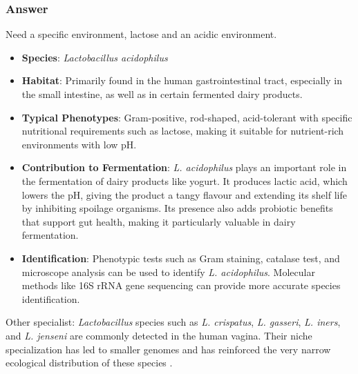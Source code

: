 \subsubsection*{Answer}
Need a specific environment, lactose and an acidic environment.
\begin{itemize}
    \item \textbf{Species}: \textit{Lactobacillus acidophilus}
    \item \textbf{Habitat}: Primarily found in the human gastrointestinal tract, especially in the small intestine, as well as in certain fermented dairy products.
    \item \textbf{Typical Phenotypes}: Gram-positive, rod-shaped, acid-tolerant with specific nutritional requirements such as lactose, making it suitable for nutrient-rich environments with low pH.
    \item \textbf{Contribution to Fermentation}: \textit{L. acidophilus} plays an important role in the fermentation of dairy products like yogurt. It produces lactic acid, which lowers the pH, giving the product a tangy flavour and extending its shelf life by inhibiting spoilage organisms. Its presence also adds probiotic benefits that support gut health, making it particularly valuable in dairy fermentation.
    \item \textbf{Identification}: Phenotypic tests such as Gram staining, catalase test, and microscope analysis can be used to identify \textit{L. acidophilus}. Molecular methods like 16S rRNA gene sequencing can provide more accurate species identification.
\end{itemize}

\vspace*{0.5em}
Other specialist:
\textit{Lactobacillus} species such as \textit{L. crispatus}, \textit{L. gasseri}, \textit{L. iners}, and \textit{L. jenseni} are commonly detected in the human vagina. Their niche specialization has
led to smaller genomes and has reinforced the very narrow ecological distribution of these species \cite*{L3-LAB}.

